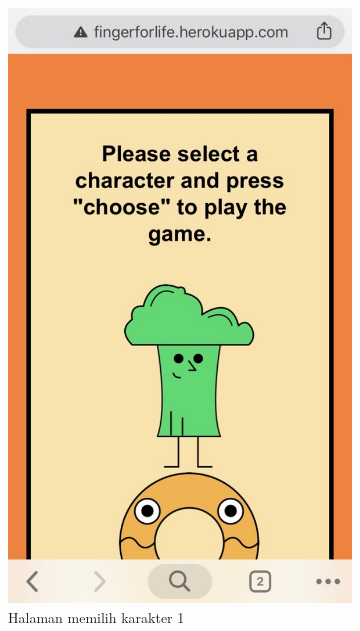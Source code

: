 \begin{enumerate}
	\begin{figure}[H]
		\begin{subfigure}{.5\textwidth}
			\centering
			\includegraphics[scale=0.2]{Gambar/realPhone3_char1}
			\caption{Halaman memilih karakter 1}
			\label{subfig:realPhone3_char1}
		\end{subfigure}
		\begin{subfigure}{.5\textwidth}
			\centering

\end{subfigure}
\end{figure}
\end{enumerate}
